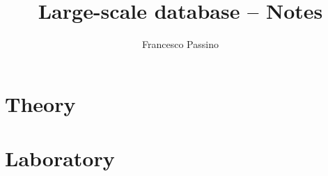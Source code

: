 \documentclass[11pt,a4paper]{article}
\title{Large-scale database -- Notes}
\author{Francesco Passino}
\date{}
\theoremstyle{breakdef}
\theoremstyle{breakplain}
\theoremstyle{remark}
\begin{document}
\maketitle
\tableofcontents
\newpage

\sloppy

\part{Theory}









\part{Laboratory}





\end{document}
